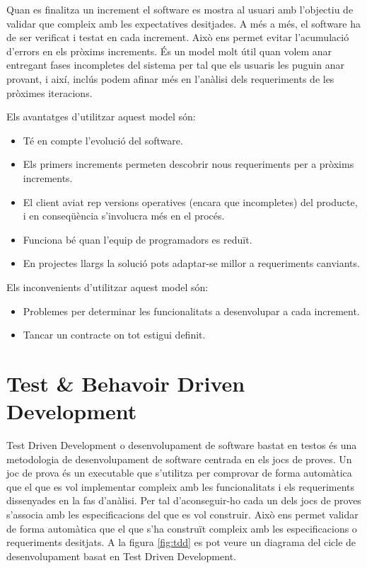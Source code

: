 Quan es finalitza un increment el software es mostra al usuari amb l'objectiu de validar que compleix amb les expectatives desitjades. A més a més, el software ha de ser verificat i testat en cada increment. Això ens permet evitar l'acumulació d'errors en els pròxims increments. És un model molt útil quan volem anar entregant fases incompletes del sistema per tal que els usuaris les puguin anar provant, i així, inclús podem afinar més en l’anàlisi dels requeriments de les pròximes iteracions.

Els avantatges d’utilitzar aquest model són:

\begin{itemize}
\item{Té en compte l’evolució del software.}
\item{Els primers increments permeten descobrir nous requeriments per a pròxims increments.}
\item{El client aviat rep versions operatives (encara que incompletes) del producte, i en conseqüència s’involucra més en el procés.}
\item{Funciona bé quan l’equip de programadors es reduït.}
\item{En projectes llargs la solució pots adaptar-se millor a requeriments canviants.}
\end{itemize}

Els inconvenients d’utilitzar aquest model són:

\begin{itemize}
\item{Problemes per determinar les funcionalitats a desenvolupar a cada increment.}
\item{Tancar un contracte on tot estigui definit.}
\end{itemize}


\section{Test \& Behavoir Driven Development}
\label{sec:tdd}

Test Driven Development o desenvolupament de software bastat en testos és una metodologia de desenvolupament de software centrada en els jocs de proves. Un joc de prova és un executable que s'utilitza per comprovar de forma automàtica que el que es vol implementar compleix amb les funcionalitats i els requeriments dissenyades en la fas d'anàlisi. Per tal d'aconseguir-ho cada un dels jocs de proves s'associa amb les especificacions del que es vol construir. Això ens permet validar de forma automàtica que el que s'ha construït compleix amb les especificacions o requeriments desitjats. A la figura \ref{fig:tdd} es pot veure un diagrama del cicle de desenvolupament basat en Test Driven Development.

